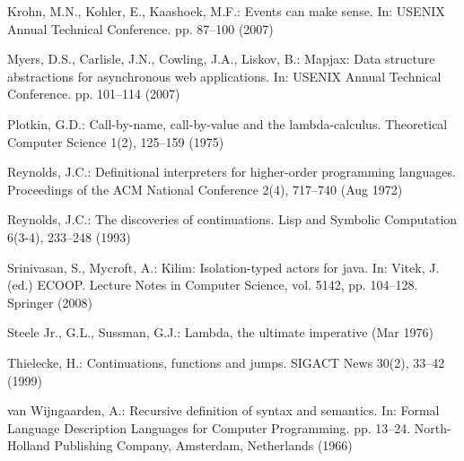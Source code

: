 \documentclass[a4paper]{llncs}
\begin{document}
\begin{thebibliography}{10}
Krohn, M.N., Kohler, E., Kaashoek, M.F.: Events can make sense. In: USENIX
  Annual Technical Conference. pp. 87--100 (2007)

Myers, D.S., Carlisle, J.N., Cowling, J.A., Liskov, B.: Mapjax: Data structure
  abstractions for asynchronous web applications. In: USENIX Annual Technical
  Conference. pp. 101--114 (2007)

Plotkin, G.D.: Call-by-name, call-by-value and the lambda-calculus. Theoretical
  Computer Science  1(2),  125--159 (1975)

Reynolds, J.C.: Definitional interpreters for higher-order programming
  languages. Proceedings of the ACM National Conference  2(4),  717--740 (Aug
  1972)

Reynolds, J.C.: The discoveries of continuations. Lisp and Symbolic Computation
   6(3-4),  233--248 (1993)

Srinivasan, S., Mycroft, A.: Kilim: Isolation-typed actors for java. In: Vitek,
  J. (ed.) ECOOP. Lecture Notes in Computer Science, vol. 5142, pp. 104--128.
  Springer (2008)

{Steele Jr.}, G.L., Sussman, G.J.: Lambda, the ultimate imperative (Mar 1976)

Thielecke, H.: Continuations, functions and jumps. SIGACT News  30(2),  33--42
  (1999)

van Wijngaarden, A.: Recursive definition of syntax and semantics. In: Formal
  Language Description Languages for Computer Programming. pp. 13--24.
  {North-Holland} Publishing Company, Amsterdam, Netherlands (1966)

\end{thebibliography}
\end{document}
